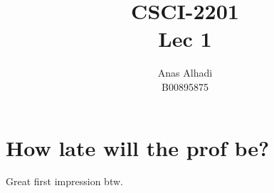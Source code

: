 \documentclass{article}
\title{\textbf{CSCI-2201\\Lec 1}}
\author{Anas Alhadi\\B00895875}
\numberwithin{equation}{subsection}
\begin{document}
	\maketitle
	\tableofcontents

	\newpage 
	\section{How late will the prof be?}
	\par{
		Great first impression btw.
	}
\end{document}
